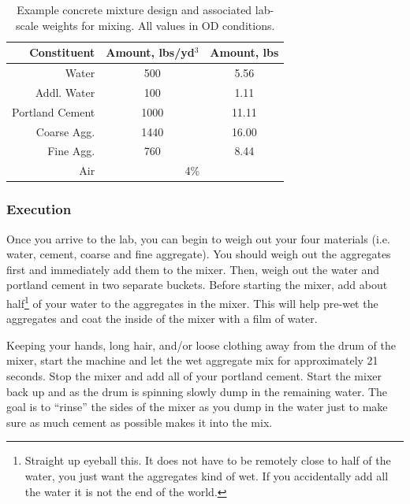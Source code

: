 \documentclass[12pt]{article}
\begin{document}
\begin{table}[h]
\begin{center}
\caption{Example concrete mixture design and associated lab-scale weights for mixing. All values in OD conditions.}
\label{tab:ODexam}
\begin{tabular}{rcc}
\hline
Constituent     & \multicolumn{1}{l}{Amount, lbs/yd$^3$} & \multicolumn{1}{l}{Amount, lbs} \\ \hline
Water           & 500                                    & 5.56                            \\
Addl. Water     & 100                                    & 1.11 \\
Portland Cement & 1000                                   & 11.11                           \\
Coarse Agg.     & 1440                                   & 16.00                           \\
Fine Agg.       & 760                                    & 8.44                            \\
Air             & \multicolumn{2}{c}{4\%}                                                  \\ \hline
\end{tabular}
\end{center}
\end{table}

\subsubsection{Execution}
Once you arrive to the lab, you can begin to weigh out your four materials (i.e. water, cement, coarse and fine aggregate). You should weigh out the aggregates first and immediately add them to the mixer. Then, weigh out the water and portland cement in two separate buckets. Before starting the mixer, add about half\footnote{Straight up eyeball this. It does not have to be remotely close to half of the water, you just want the aggregates kind of wet. If you accidentally add all the water it is not the end of the world.} of your water to the aggregates in the mixer. This will help pre-wet the aggregates and coat the inside of the mixer with a film of water.

Keeping your hands, long hair, and/or loose clothing away from the drum of the mixer, start the machine and let the wet aggregate mix for approximately 21 seconds. Stop the mixer and add all of your portland cement. Start the mixer back up and as the drum is spinning slowly dump in the remaining water. The goal is to ``rinse'' the sides of the mixer as you dump in the water just to make sure as much cement as possible makes it into the mix.
\end{document}
